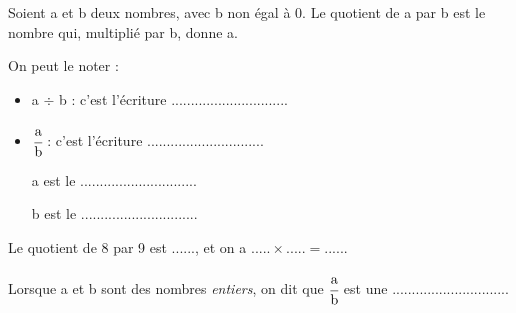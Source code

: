 \documentclass[a4paper,11pt]{beamer}
\begin{document}
\begin{frame}
	\begin{cours}
		Soient a et b deux nombres, avec b non égal à 0. Le quotient de a par b est le nombre qui, multiplié par b, donne a.

		On peut le noter :
		\begin{itemize}
			\item a $÷$ b : c'est l'écriture  .............................. %
			      \vspace{0.5em}
			\item $\cfrac{\text{a}}{\text{b}}$ : c'est l'écriture .............................. %

			      a est le .............................. %

			      b est le .............................. %
		\end{itemize}
	\end{cours}

	\begin{exemple}
		Le quotient de 8 par 9 est ......, et on a $..... × ..... = .....$.
	\end{exemple}
\end{frame}

\begin{frame}
	\begin{cours}[Fractions]
		Lorsque a et b sont des nombres \textit{entiers}, on dit que $\cfrac{\text{a}}{\text{b}}$ est une .............................. %
	\end{cours}
\end{frame}
\end{document}
